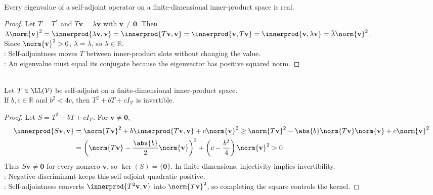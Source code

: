 \begin{theorem} \label{thm:self-adjoint-eigenvalues-real} \\
Every eigenvalue of a self-adjoint operator on a finite-dimensional inner-product space is real.
\begin{proof}
Let $T=T^*$ and $T\mathbf{v}=\lambda\mathbf{v}$ with $\mathbf{v}\neq\mathbf{0}$. Then $\lambda\norm{\mathbf{v}}^2 =\innerprod{\lambda\mathbf{v},\mathbf{v}} =\innerprod{T\mathbf{v},\mathbf{v}} =\innerprod{\mathbf{v},T\mathbf{v}} =\innerprod{\mathbf{v},\lambda\mathbf{v}} =\overline{\lambda}\norm{\mathbf{v}}^2$.\\
Since $\norm{\mathbf{v}}^2>0$, $\lambda=\overline{\lambda}$, so $\lambda\in\mathbb{R}$.\\
: Self-adjointness moves $T$ between inner-product slots without changing the value.\\
: An eigenvalue must equal its conjugate because the eigenvector has positive squared norm.
\end{proof}
\end{theorem}

\begin{proposition} \label{prop:invertible-quadratic-self-adjoint} \\
Let $T\in\LL(\mathcal{V})$ be self-adjoint on a finite-dimensional inner-product space.\\
If $b,c\in\mathbb{R}$ and $b^2<4c$, then $T^2+bT+cI_{\mathcal{V}}$ is invertible.
\begin{proof}
Let $S=T^2+bT+cI_{\mathcal{V}}$. For $\mathbf{v}\neq\mathbf{0}$,
\begin{align}
\innerprod{S\mathbf{v},\mathbf{v}} &=\norm{T\mathbf{v}}^2+b\innerprod{T\mathbf{v},\mathbf{v}}+c\norm{\mathbf{v}}^2 \geq \norm{T\mathbf{v}}^2-\abs{b}\norm{T\mathbf{v}}\norm{\mathbf{v}}+c\norm{\mathbf{v}}^2 \nonumber \\
&=\left(\norm{T\mathbf{v}}-\frac{\abs{b}}{2}\norm{\mathbf{v}}\right)^2+\left(c-\frac{b^2}{4}\right)\norm{\mathbf{v}}^2>0 \nonumber
\end{align}
Thus $S\mathbf{v}\neq\mathbf{0}$ for every nonzero $\mathbf{v}$, so $\ker(S)=\{\mathbf{0}\}$. In finite dimensions, injectivity implies invertibility.\\
: Negative discriminant keeps this self-adjoint quadratic positive.\\
: Self-adjointness converts $\innerprod{T^2\mathbf{v},\mathbf{v}}$ into $\norm{T\mathbf{v}}^2$, so completing the square controls the kernel.
\end{proof}
\end{proposition}

